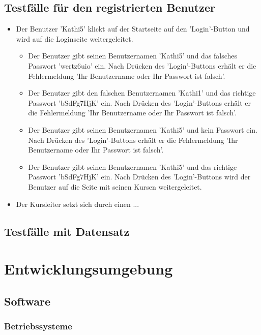 \documentclass[a4paper]{scrreprt}
\newcounter{Lc}
\newcounter{Hc}
\newcommand{\stepHc}{\stepcounter{Hc}\setcounter{Lc}{0}}
\begin{document}
	\section{Testfälle für den registrierten Benutzer}
		\stepHc
		\begin{itemize}
			\item {} 
			Der Benutzer 'Kathi5' klickt auf der Startseite	auf den 'Login'-Button und wird auf die Loginseite weitergeleitet.
			\begin{itemize}
				\item Der Benutzer gibt seinen Benutzernamen 'Kathi5' und das falsches Passwort 'wertz6uio' ein. Nach Drücken des 'Login'-Buttons erhält er die Fehlermeldung 'Ihr Benutzername oder Ihr Passwort ist falsch'.
				\item Der Benutzer gibt den falschen Benutzernamen 'Kathi1' und das richtige Passwort 'bSdFg7HjK' ein. Nach Drücken des 'Login'-Buttons erhält er die Fehlermeldung 'Ihr Benutzername oder Ihr Passwort ist falsch'.
				\item Der Benutzer gibt seinen Benutzernamen 'Kathi5' und kein Passwort ein. Nach Drücken des 'Login'-Buttons erhält er die Fehlermeldung 'Ihr Benutzername oder Ihr Passwort ist falsch'.
				\item Der Benutzer gibt seinen Benutzernamen 'Kathi5' und das richtige Passwort 'bSdFg7HjK' ein. Nach Drücken des 'Login'-Buttons wird der Benutzer auf die Seite mit seinen Kursen weitergeleitet.
			\end{itemize}
			\item {} 
			Der Kursleiter setzt sich durch einen ... 		
		\end{itemize}

\section{Testfälle mit Datensatz}






\chapter{Entwicklungsumgebung}
    \section{Software}
        \subsection{Betriebssysteme}
            
\end{document}
